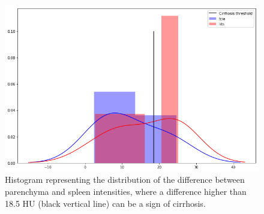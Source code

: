 \documentclass[]{article}
\begin{document}
\begin{figure}[!ht]
	\centering
	\includegraphics[width=0.6\linewidth]{../Contributions/images/LITS_TCIA_cirrhosisPlot}
	\caption{Histogram representing the distribution of the difference between parenchyma and spleen intensities, where a difference higher than 18.5 HU (black vertical line) can be a sign of cirrhosis.}
	\label{fig:cirrhosisPlot}
\end{figure}
\end{document}
